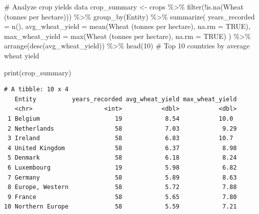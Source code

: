 \documentclass[
  letterpaper,
]{book}
\newenvironment{Shaded}{\begin{snugshade}}{\end{snugshade}}
\newcommand{\AttributeTok}[1]{\textcolor[rgb]{0.40,0.45,0.13}{#1}}
\newcommand{\CommentTok}[1]{\textcolor[rgb]{0.37,0.37,0.37}{#1}}
\newcommand{\ConstantTok}[1]{\textcolor[rgb]{0.56,0.35,0.01}{#1}}
\newcommand{\DecValTok}[1]{\textcolor[rgb]{0.68,0.00,0.00}{#1}}
\newcommand{\FunctionTok}[1]{\textcolor[rgb]{0.28,0.35,0.67}{#1}}
\newcommand{\NormalTok}[1]{\textcolor[rgb]{0.00,0.23,0.31}{#1}}
\newcommand{\OtherTok}[1]{\textcolor[rgb]{0.00,0.23,0.31}{#1}}
\newcommand{\SpecialCharTok}[1]{\textcolor[rgb]{0.37,0.37,0.37}{#1}}
\newcommand{\StringTok}[1]{\textcolor[rgb]{0.13,0.47,0.30}{#1}}
\begin{document}
\begin{Shaded}
\begin{Highlighting}[]
\CommentTok{\# Analyze crop yields data}
\NormalTok{crop\_summary }\OtherTok{\textless{}{-}}\NormalTok{ crops }\SpecialCharTok{\%\textgreater{}\%}
  \FunctionTok{filter}\NormalTok{(}\SpecialCharTok{!}\FunctionTok{is.na}\NormalTok{(}\StringTok{\textasciigrave{}}\AttributeTok{Wheat (tonnes per hectare)}\StringTok{\textasciigrave{}}\NormalTok{)) }\SpecialCharTok{\%\textgreater{}\%}
  \FunctionTok{group\_by}\NormalTok{(Entity) }\SpecialCharTok{\%\textgreater{}\%}
  \FunctionTok{summarize}\NormalTok{(}
    \AttributeTok{years\_recorded =} \FunctionTok{n}\NormalTok{(),}
    \AttributeTok{avg\_wheat\_yield =} \FunctionTok{mean}\NormalTok{(}\StringTok{\textasciigrave{}}\AttributeTok{Wheat (tonnes per hectare)}\StringTok{\textasciigrave{}}\NormalTok{, }\AttributeTok{na.rm =} \ConstantTok{TRUE}\NormalTok{),}
    \AttributeTok{max\_wheat\_yield =} \FunctionTok{max}\NormalTok{(}\StringTok{\textasciigrave{}}\AttributeTok{Wheat (tonnes per hectare)}\StringTok{\textasciigrave{}}\NormalTok{, }\AttributeTok{na.rm =} \ConstantTok{TRUE}\NormalTok{)}
\NormalTok{  ) }\SpecialCharTok{\%\textgreater{}\%}
  \FunctionTok{arrange}\NormalTok{(}\FunctionTok{desc}\NormalTok{(avg\_wheat\_yield)) }\SpecialCharTok{\%\textgreater{}\%}
  \FunctionTok{head}\NormalTok{(}\DecValTok{10}\NormalTok{)  }\CommentTok{\# Top 10 countries by average wheat yield}

\FunctionTok{print}\NormalTok{(crop\_summary)}
\end{Highlighting}
\end{Shaded}

\begin{verbatim}
# A tibble: 10 x 4
   Entity          years_recorded avg_wheat_yield max_wheat_yield
   <chr>                    <int>           <dbl>           <dbl>
 1 Belgium                     19            8.54           10.0 
 2 Netherlands                 58            7.03            9.29
 3 Ireland                     58            6.83           10.7 
 4 United Kingdom              58            6.37            8.98
 5 Denmark                     58            6.18            8.24
 6 Luxembourg                  19            5.98            6.82
 7 Germany                     58            5.89            8.63
 8 Europe, Western             58            5.72            7.88
 9 France                      58            5.65            7.80
10 Northern Europe             58            5.59            7.21
\end{verbatim}
\end{document}

